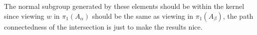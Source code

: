 The normal subgroup generated by these elements should be within the kernel since viewing $w$ in $\pi_1(A_\alpha)$ should be the same as viewing in $\pi_1(A_\beta)$, the path connectedness of the intersection is just to make the results nice.